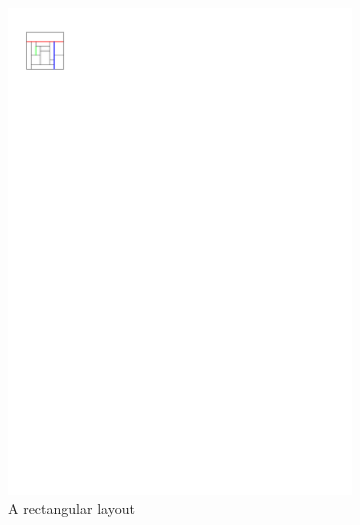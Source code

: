   \begin{figure}
      \centering
      \begin{subfigure}[b]{0.45 \textwidth}
        \centering
        \includegraphics[scale=1]{rectangularDuals/img/segmentdefs}
        \caption{A rectangular layout}
        \label{fig:intr:segmentdefs}
      \end{subfigure}
      ~
      \begin{subfigure}[b]{0.45 \textwidth}
        \centering

\end{subfigure}
\end{figure}
